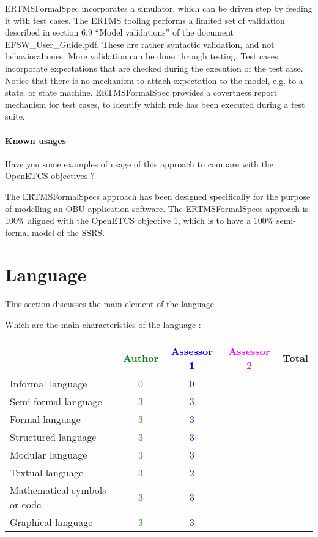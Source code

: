 \begin{assessor1}
ERTMSFormalSpec incorporates a simulator, which can be driven step by feeding it with test cases. 
The ERTMS tooling performs a limited set of validation described in section 6.9 "`Model validations"' of the document EFSW\_User\_Guide.pdf. These are rather syntactic validation, and not behavioral ones. More validation can be done through testing. Test cases incorporate expectations that are checked during the execution of the test case. Notice that there is no mechanism to attach expectation to the model, e.g. to a state, or state machine. ERTMSFormalSpec provides a covertness report mechanism for test cases, to identify which rule has been executed during a test suite. 
\end{assessor1}

\paragraph{Known usages} Have you some examples of usage of this approach to compare with the OpenETCS objectives ?

\begin{author_comment}
The ERTMSFormalSpecs approach has been designed specifically for the purpose of modelling an OBU application software. The ERTMSFormalSpecs approach is 100\% aligned with the OpenETCS objective 1, which is to have a 100\% semi-formal model of the SSRS. 
\end{author_comment}

\section{Language}
This section discusses the main element of the language.

Which are the main characteristics of the language :

\begin{tabular}{|l | c | c | c | c|}
\hline
& \textcolor{green}{Author} & \textcolor{blue}{Assessor 1} & \textcolor{magenta}{Assessor 2} & Total \\
\hline 
Informal language & \textcolor{green}{0} & \textcolor{blue}{0} & &  \\
\hline 
Semi-formal language & \textcolor{green}{3} & \textcolor{blue}{3} & &  \\
\hline
Formal language & \textcolor{green}{3} & \textcolor{blue}{3} & &  \\
\hline
Structured language & \textcolor{green}{3} & \textcolor{blue}{3} & & \\
\hline
Modular language & \textcolor{green}{3} & \textcolor{blue}{3} & & \\
\hline
Textual language & \textcolor{green}{3} & \textcolor{blue}{2} & & \\
\hline
Mathematical symbols or code & \textcolor{green}{3} & \textcolor{blue}{3} & & \\
\hline
Graphical language & \textcolor{green}{3} & \textcolor{blue}{3} & & \\
\hline
\end{tabular}

